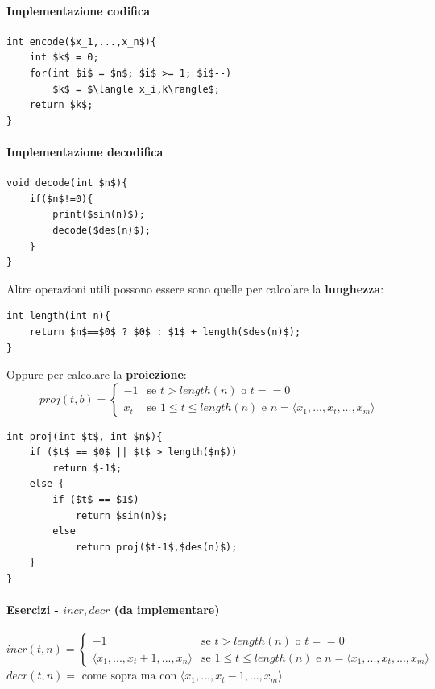 \documentclass{article}
\begin{document}
\paragraph{Implementazione codifica}\mbox{}
\begin{lstlisting}[mathescape=true]
int encode($x_1,...,x_n$){
    int $k$ = 0;
    for(int $i$ = $n$; $i$ >= 1; $i$--)
        $k$ = $\langle x_i,k\rangle$;
    return $k$;
}
\end{lstlisting}
\paragraph{Implementazione decodifica}\mbox{}
\begin{lstlisting}[mathescape=true]
void decode(int $n$){
    if($n$!=0){
        print($sin(n)$);
        decode($des(n)$);
    }
}
\end{lstlisting}

Altre operazioni utili possono essere sono quelle per calcolare la \textbf{lunghezza}:
\begin{lstlisting}[mathescape]
int length(int n){
    return $n$==$0$ ? $0$ : $1$ + length($des(n)$);
}
\end{lstlisting}
Oppure per calcolare la \textbf{proiezione}:
\[
    proj(t,b)=
    \begin{cases}
        -1  & \text{se } t>length(n)\text{ o }t==0                                           \\
        x_t & \text{se }1\leq t\leq length(n)\text{ e }n=\langle x_1,...,x_t,..., x_m\rangle
    \end{cases}
\]
\begin{lstlisting}[mathescape]
int proj(int $t$, int $n$){
    if ($t$ == $0$ || $t$ > length($n$))
        return $-1$;
    else {
        if ($t$ == $1$)
            return $sin(n)$;
        else
            return proj($t-1$,$des(n)$);
    }
}
\end{lstlisting}
\paragraph{Esercizi - $incr,decr$ (da implementare)}\mbox{}
\[incr(t,n)=
    \begin{cases}
        -1                                    & \text{se }t>length(n)\text{ o }t==0                                            \\
        \langle x_1, ...,x_t+1,...,x_n\rangle & \text{se } 1\leq t\leq length(n)\text{ e }n=\langle x_1,...,x_t,...,x_m\rangle
    \end{cases}
\]
$decr(t,n)=\text{ come sopra ma con }\langle x_1,...,x_t-1,...,x_m\rangle$
\end{document}
